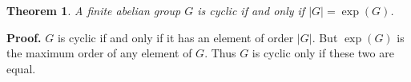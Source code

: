 \documentclass[12pt]{article}
\newtheorem{thm}{Theorem}
\begin{document}
\begin{thm}A finite abelian group $G$ is cyclic if and only if $\lvert G\rvert=\exp(G)$.
\end{thm}
\textbf{Proof. }
$G$ is cyclic if and only if it has an element of order $\lvert G\rvert$. But $\exp(G)$ is the maximum order of any element of $G$. Thus $G$ is cyclic only if these two are equal.

\end{document}
